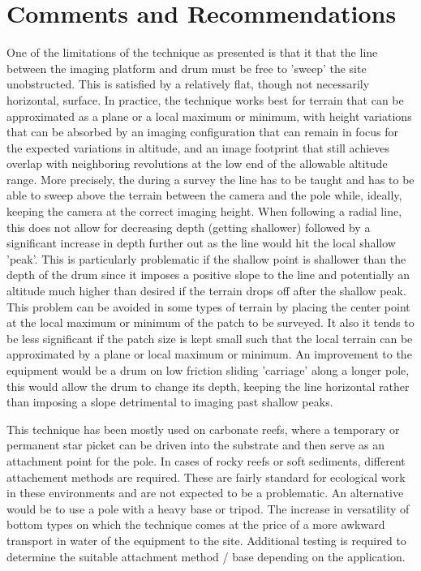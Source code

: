 \section{Comments and Recommendations}


One of the limitations of the technique as presented is that it that the line between the imaging platform and drum must be free to 'sweep' the site unobstructed. This is satisfied by a relatively flat, though not necessarily horizontal, surface. In practice, the technique works best for terrain that can be approximated as a plane or a local maximum or minimum, with height variations that can be absorbed by an imaging configuration that can remain in focus for the expected variations in altitude, and an image footprint that still achieves overlap with neighboring revolutions at the low end of the allowable altitude range.
More precisely, the during a survey the line has to be taught and has to be able to sweep above the terrain between the camera and the pole while, ideally, keeping the camera at the correct imaging height. When following a radial line, this does not allow for decreasing depth (getting shallower) followed by a significant increase in depth further out as the line would hit the local shallow 'peak'. This is particularly problematic if the shallow point is shallower than the depth of the drum since it imposes a positive slope to the line and potentially an altitude much higher than desired if the terrain drops off after the shallow peak. This problem can be avoided in some types of terrain by placing the center point at the local maximum or minimum of the patch to be surveyed. It also it tends to be less significant if the patch size is kept small such that the local terrain can be approximated by a plane or local maximum or minimum.
An improvement to the equipment would be a drum on low friction sliding 'carriage' along a longer pole, this would allow the drum to change its depth, keeping the line horizontal rather than imposing a slope detrimental to imaging past shallow peaks.

This technique has been mostly used on carbonate reefs, where a temporary or permanent star picket can be driven into the substrate and then serve as an attachment point for the pole. In cases of rocky reefs or soft sediments, different attachement methods are required. These are fairly standard for ecological work in these environments and are not expected to be a problematic. An alternative would be to use a pole with a heavy base or tripod. The increase in versatility of bottom types on which the technique comes at the price of a more awkward transport in water of the equipment to the site. Additional testing is required to determine the suitable attachment method / base depending on the application.